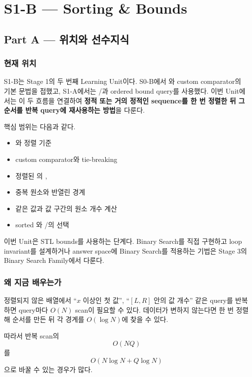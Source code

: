 \chapter{S1-B --- Sorting \& Bounds}

\section{Part A --- 위치와 선수지식}

\subsection{현재 위치}
S1-B는 Stage 1의 두 번째 Learning Unit이다. S0-B에서 와 custom comparator의 기본 문법을 접했고, S1-A에서는 /과 ordered bound query를 사용했다. 이번 Unit에서는 이 두 흐름을 연결하여 \textbf{정적 또는 거의 정적인 sequence를 한 번 정렬한 뒤 그 순서를 반복 query에 재사용하는 방법}을 다룬다.

핵심 범위는 다음과 같다.
\begin{itemize}
\item {}와 정렬 기준
\item custom comparator와 tie-breaking
\item 정렬된 의 , 
\item 중복 원소와 반열린 경계
\item 같은 값과 값 구간의 원소 개수 계산
\item sorted 와 /의 선택
\end{itemize}

이번 Unit은 STL bounds를 사용하는 단계다. Binary Search를 직접 구현하고 loop invariant를 설계하거나 answer space에 Binary Search를 적용하는 기법은 Stage 3의 Binary Search Family에서 다룬다.

\subsection{왜 지금 배우는가}
정렬되지 않은 배열에서 “$x$ 이상인 첫 값”, “$[L,R]$ 안의 값 개수” 같은 query를 반복하면 query마다 $O(N)$ scan이 필요할 수 있다. 데이터가 변하지 않는다면 한 번 정렬해 순서를 만든 뒤 각 경계를 $O(\log N)$에 찾을 수 있다.

따라서 반복 scan의
\[
O(NQ)
\]
를
\[
O(N\log N+Q\log N)
\]
으로 바꿀 수 있는 경우가 많다.

